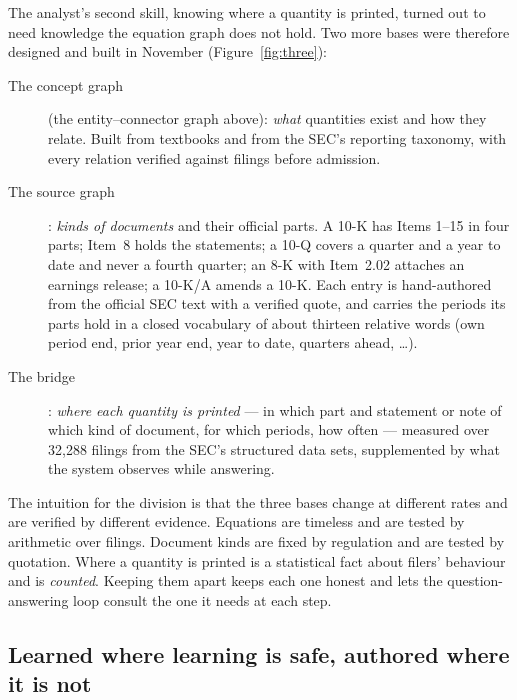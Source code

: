 The analyst's second skill, knowing where a quantity is printed, turned out to need knowledge the equation graph does not hold. Two more bases were therefore designed and built in November (Figure~\ref{fig:three}):

\begin{description}
\item[The concept graph] (the entity--connector graph above): \emph{what} quantities exist and how they relate. Built from textbooks and from the SEC's reporting taxonomy, with every relation verified against filings before admission.
\item[The source graph]: \emph{kinds of documents} and their official parts. A 10-K has Items 1--15 in four parts; Item~8 holds the statements; a 10-Q covers a quarter and a year to date and never a fourth quarter; an 8-K with Item~2.02 attaches an earnings release; a 10-K/A amends a 10-K. Each entry is hand-authored from the official SEC text with a verified quote, and carries the periods its parts hold in a closed vocabulary of about thirteen relative words (own period end, prior year end, year to date, quarters ahead, \ldots).
\item[The bridge]: \emph{where each quantity is printed} --- in which part and statement or note of which kind of document, for which periods, how often --- measured over 32,288 filings from the SEC's structured data sets, supplemented by what the system observes while answering.
\end{description}



The intuition for the division is that the three bases change at different rates and are verified by different evidence. Equations are timeless and are tested by arithmetic over filings. Document kinds are fixed by regulation and are tested by quotation. Where a quantity is printed is a statistical fact about filers' behaviour and is \emph{counted}. Keeping them apart keeps each one honest and lets the question-answering loop consult the one it needs at each step.

\subsection{Learned where learning is safe, authored where it is not}

